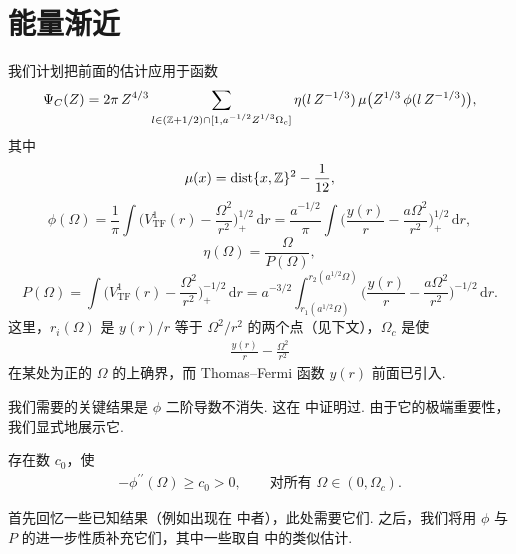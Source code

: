 \section{能量渐近}

我们计划把前面的估计应用于函数
\begin{equation}\label{eq:9.17}
  \Psi_{C}(Z)=2\pi\,Z^{4/3}
  \sum_{\substack{l\in(\mathbb{Z}+1/2)\cap[1,a^{-1/2}Z^{1/3}\Omega_{c}]}}
  \eta(l\,Z^{-1/3})\,\mu\bigl(Z^{1/3}\,\phi(l\,Z^{-1/3})\bigr),
\end{equation}
其中
\begin{equation}\label{eq:9.18}
  \mu(x)=\operatorname{dist}\{x,\mathbb{Z}\}^{2}-\frac{1}{12},
\end{equation}
\begin{equation}\label{eq:9.19}
  \phi(\Omega)=\frac{1}{\pi}\int\Big(V_{\mathrm{TF}}^{1}(r)-\frac{\Omega^{2}}{r^{2}}\Big)_{+}^{1/2}\,\mathrm{d}r
  =\frac{a^{-1/2}}{\pi}\int\Big(\frac{y(r)}{r}-\frac{a\Omega^{2}}{r^{2}}\Big)_{+}^{1/2}\,\mathrm{d}r,
\end{equation}
\begin{equation}\label{eq:9.20}
  \eta(\Omega)=\frac{\Omega}{P(\Omega)},
\end{equation}
\begin{equation}\label{eq:9.21}
  P(\Omega)=\int\Big(V_{\mathrm{TF}}^{1}(r)-\frac{\Omega^{2}}{r^{2}}\Big)_{+}^{-1/2}\,\mathrm{d}r
  =a^{-3/2}\int_{r_{1}(a^{1/2}\Omega)}^{r_{2}(a^{1/2}\Omega)}
  \Big(\frac{y(r)}{r}-\frac{a\Omega^{2}}{r^{2}}\Big)^{-1/2}\,\mathrm{d}r.
\end{equation}
这里，$r_i(\Omega)$ 是 $y(r)/r$ 等于 $\Omega^2/r^2$ 的两个点（见下文），$\Omega_c$ 是使
\begin{align*}
  \frac{y(r)}{r}-\frac{\Omega^{2}}{r^{2}}
\end{align*}
在某处为正的 $\Omega$ 的上确界，而 Thomas--Fermi 函数 $y(r)$ 前面已引入.

我们需要的关键结果是 $\phi$ 二阶导数不消失. 这在 \cite{b208} 中证明过. 由于它的极端重要性，我们显式地展示它.

\begin{theorem}\label{thm:9.10}
存在数 $c_{0}$，使
\begin{align*}
  -\phi^{\prime\prime}(\Omega)\ge c_{0}>0,\qquad \text{对所有 } \Omega\in(0,\Omega_{c}).
\end{align*}
\end{theorem}

首先回忆一些已知结果（例如出现在 \cite{b208,b218,b219} 中者），此处需要它们. 之后，我们将用 $\phi$ 与 $P$ 的进一步性质补充它们，其中一些取自 \cite{b207,b208,b209,b210,b211} 中的类似估计.

